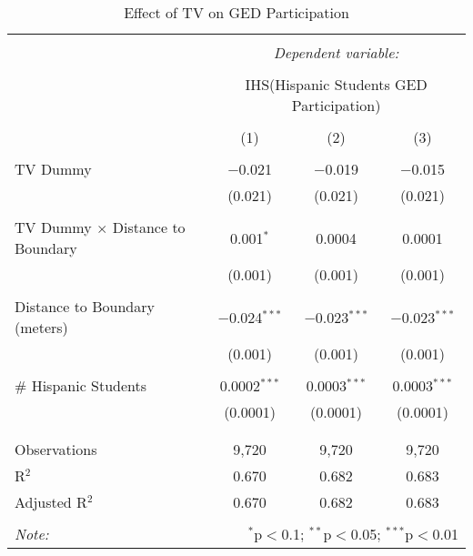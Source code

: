 
\begin{table}[!htbp] \centering 
  \caption{Effect of TV on GED Participation} 
  \label{} 
\begin{tabular}{@{\extracolsep{-2pt}}lccc} 
\\[-1.8ex]\hline 
\hline \\[-1.8ex] 
 & \multicolumn{3}{c}{\textit{Dependent variable:}} \\ 
\cline{2-4} 
\\[-1.8ex] & \multicolumn{3}{c}{IHS(Hispanic Students GED Participation)} \\ 
\\[-1.8ex] & (1) & (2) & (3)\\ 
\hline \\[-1.8ex] 
 TV Dummy & $-$0.021 & $-$0.019 & $-$0.015 \\ 
  & (0.021) & (0.021) & (0.021) \\ 
  & & & \\ 
 TV Dummy $\times$ Distance to Boundary & 0.001$^{*}$ & 0.0004 & 0.0001 \\ 
  & (0.001) & (0.001) & (0.001) \\ 
  & & & \\ 
 Distance to Boundary (meters) & $-$0.024$^{***}$ & $-$0.023$^{***}$ & $-$0.023$^{***}$ \\ 
  & (0.001) & (0.001) & (0.001) \\ 
  & & & \\ 
 \# Hispanic Students & 0.0002$^{***}$ & 0.0003$^{***}$ & 0.0003$^{***}$ \\ 
  & (0.0001) & (0.0001) & (0.0001) \\ 
  & & & \\ 
\hline \\[-1.8ex] 
Observations & 9,720 & 9,720 & 9,720 \\ 
R$^{2}$ & 0.670 & 0.682 & 0.683 \\ 
Adjusted R$^{2}$ & 0.670 & 0.682 & 0.683 \\ 
\hline 
\hline \\[-1.8ex] 
\textit{Note:}  & \multicolumn{3}{r}{$^{*}$p$<$0.1; $^{**}$p$<$0.05; $^{***}$p$<$0.01} \\ 
\end{tabular} 
\end{table} 
